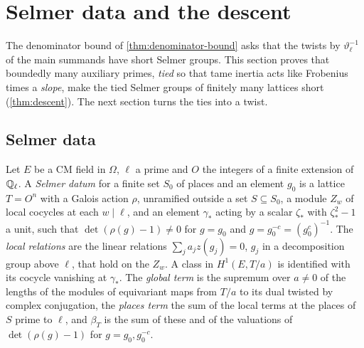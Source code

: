 \section{Selmer data and the descent}\label{sec:selmer}

The denominator bound of \cref{thm:denominator-bound} asks that the twists by $\vartheta^{-1}_\ell$ of the main summands have short Selmer groups. This section proves that boundedly
many auxiliary primes, \emph{tied} so that tame inertia acts like Frobenius times a \emph{slope}, make the tied Selmer groups of finitely many lattices short
(\cref{thm:descent}). The next section turns the ties into a twist.

\subsection{Selmer data}\label{ss:selmer-data}
Let $E$ be a CM field in $\Omega$, $\ell$ a prime and $O$ the integers of a finite extension of $\mathbb{Q}_\ell$. A \emph{Selmer datum} for a finite set $S_0$ of places and an element $g_0$ is a lattice $T=O^n$ with a Galois action $\rho$,
unramified outside a set $S\subseteq S_0$, a module $Z_w$ of local cocycles at each $w\mid\ell$, and an element $\gamma_*$ acting by a scalar $\zeta_*$ with $\zeta_*^2-1$ a unit, such that $\det(\rho(g)-1)\ne0$ for $g=g_0$ and $g=g_0^{-c}=(g_0^c)^{-1}$.
The \emph{local relations} are the linear relations $\sum_ja_jz(g_j)=0$, $g_j$ in a decomposition group above $\ell$, that hold on the $Z_w$. A class in $H^1(E,T/a)$ is identified with its cocycle vanishing at $\gamma_*$. The \emph{global term}
is the supremum over $a\ne0$ of the lengths of the modules of equivariant maps from $T/a$ to its dual twisted by complex conjugation, the \emph{places term} the sum of the local terms at the places of $S$ prime to $\ell$, and
$\beta_T$ is the sum of these and of the valuations of $\det(\rho(g)-1)$ for $g=g_0,g_0^{-c}$.
